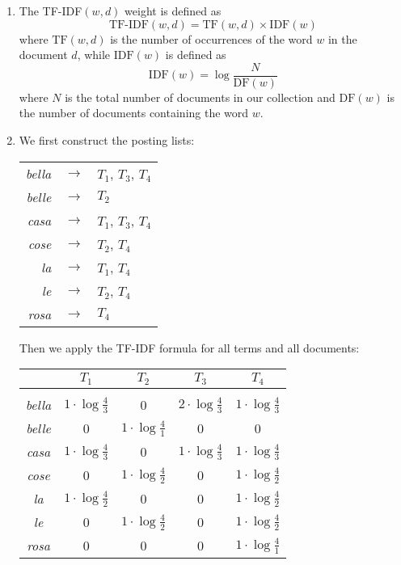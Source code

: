 \begin{enumerate}

  \item The TF-IDF$(w, d)$ weight is defined as $$\text{TF-IDF}(w, d) =
  \text{TF}(w, d) \times \text{IDF}(w)$$ where $\text{TF}(w, d)$ is the number
  of occurrences of the word $w$ in the document $d$, while $\text{IDF}(w)$ is
  defined as $$\text{IDF}(w) = \log \frac{N}{\text{DF}(w)}$$ where $N$ is the
  total number of documents in our collection and $\text{DF}(w)$ is the number
  of documents containing the word $w$.

  \item We first construct the posting lists:
  \begin{longtable}{rcl}
    \emph{bella} & $\rightarrow$ & $T_1$, $T_3$, $T_4$ \\
    \emph{belle} & $\rightarrow$ & $T_2$ \\
    \emph{casa} & $\rightarrow$ & $T_1$, $T_3$, $T_4$ \\
    \emph{cose} & $\rightarrow$ & $T_2$, $T_4$ \\
    \emph{la} & $\rightarrow$ & $T_1$, $T_4$ \\
    \emph{le} & $\rightarrow$ & $T_2$, $T_4$ \\
    \emph{rosa} & $\rightarrow$ & $T_4$ \\
  \end{longtable}
  Then we apply the TF-IDF formula for all terms and all documents:
  \begin{center}
    \begin{tabular}{c|c|c|c|c|}
                   & $T_1$ & $T_2$ & $T_3$ & $T_4$ \\ \hline &&&&\\[-1em]
      \emph{bella} & $1 \cdot\log\frac{4}{3}$ & 0
                   & $2 \cdot\log\frac{4}{3}$ & $1 \cdot\log\frac{4}{3}$\\[3pt]
      \emph{belle} & 0 & $1 \cdot\log\frac{4}{1}$ & 0 & 0 \\[3pt]
      \emph{casa}  & $1 \cdot\log\frac{4}{3}$ & 0
                   & $1 \cdot\log\frac{4}{3}$ & $1 \cdot\log\frac{4}{3}$ \\[3pt]
      \emph{cose}  & 0 & $1 \cdot\log\frac{4}{2}$
                   & 0 & $1 \cdot\log\frac{4}{2}$ \\[3pt]
      \emph{la}    & $1 \cdot\log\frac{4}{2}$ & 0
                   & 0 & $1 \cdot\log\frac{4}{2}$ \\[3pt]
      \emph{le}    & 0 & $1 \cdot\log\frac{4}{2}$
                   & 0 & $1 \cdot\log\frac{4}{2}$ \\[3pt]
      \emph{rosa}  & 0 & 0 & 0 & $1 \cdot\log\frac{4}{1}$ \\[3pt] \hline
    \end{tabular}
  \end{center}


\end{enumerate}
